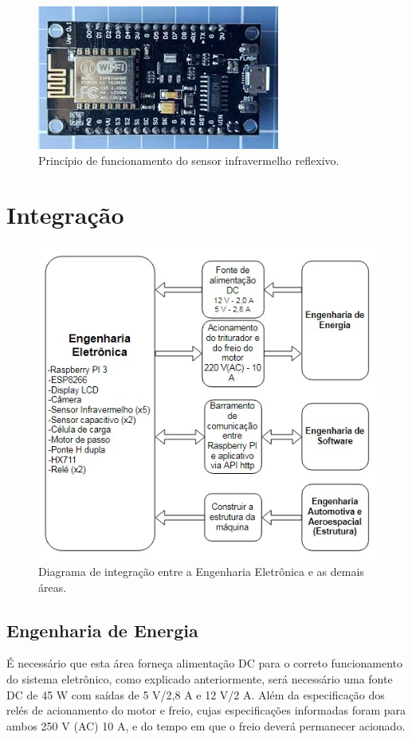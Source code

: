\begin{figure}[!ht]
	\centering
		\includegraphics[scale=0.7]{figuras/eletronica/23-Microcontrolador-ESP8266.jpg}
	\caption{Princípio de funcionamento do sensor infravermelho reflexivo.}
\end{figure}

\section{Integração}
\begin{figure}[!ht]
	\centering
		\includegraphics[scale=0.8]{figuras/eletronica/24-Diagrama-de-integracao.jpg}
	\caption{Diagrama de integração entre a Engenharia Eletrônica e as demais áreas.}
\end{figure}

\subsection{Engenharia de Energia}
É necessário que esta área forneça alimentação DC para o correto funcionamento do sistema eletrônico, como explicado anteriormente, será necessário uma fonte DC de 45 W com saídas de 5 V/2,8 A e 12 V/2 A. Além da especificação dos relés de acionamento do motor e freio, cujas especificações informadas foram para ambos 250 V (AC) 10 A, e do tempo em que o freio deverá permanecer acionado.

